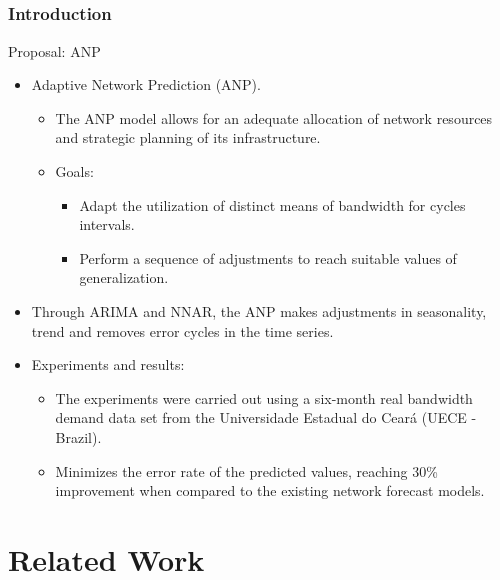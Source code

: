 \documentclass[aspectratio=169]{beamer}
\begin{document}

\subsection{}
\begin{frame}
\frametitle{Introduction}
\begin{block}{Proposal: ANP}
    \begin{itemize}
        \item Adaptive Network Prediction (ANP).
        \begin{itemize}[triangle]\small
        	\item The ANP model allows for an adequate allocation of network resources and strategic planning of its infrastructure.
            \item Goals:
            \begin{itemize}[square]\small
            	\item Adapt the utilization of distinct means of bandwidth for cycles intervals.
            	\item Perform a sequence of adjustments to reach suitable values of generalization.
            \end{itemize}
        \end{itemize}
        \item Through ARIMA and NNAR, the ANP makes adjustments in seasonality, trend and removes error cycles in the time series.
        \item Experiments and results:
        \begin{itemize}[triangle]\small
        	\item The experiments were carried out using a six-month real bandwidth demand data set from the Universidade Estadual do Ceará (UECE - Brazil).
        	\item Minimizes the error rate of the predicted values, reaching 30\% improvement when compared to the existing network forecast models.
        \end{itemize}
    \end{itemize}
\end{block}
\end{frame}


\section{Related Work}
\end{document}
